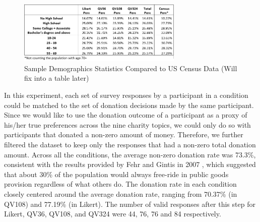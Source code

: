 \begin{figure}[htpb]
    \centering
    \includegraphics[width=0.7\textwidth, keepaspectratio=true]{content/image/demographics_table.png}
    \caption{
        Sample Demographics Statistics Compared to US Census Data (Will fix into a table later)
    }
    \label{fig:demo_exp1}
\end{figure}
    

In this experiment, each set of survey responses by a participant in a condition could be matched to the set of donation decisions made by the same participant. Since we would like to use the donation outcome of a participant as a proxy of his/her true preferences across the nine charity topics, we could only do so with participants that donated a non-zero amount of money. Therefore, we further filtered the dataset to keep only the responses that had a non-zero total donation amount. Across all the conditions, the average non-zero donation rate was 73.3\%, consistent with the results provided by Fehr and Gintis in 2007 \cite{fehr2007human}, which suggested that about 30\% of the population would always free-ride in public goods provision regardless of what others do. The donation rate in each condition closely centered around the average donation rate, ranging from 70.37\% (in QV108) and 77.19\% (in Likert). The number of valid responses after this step for Likert, QV36, QV108, and QV324 were 44, 76, 76 and 84 respectively.

